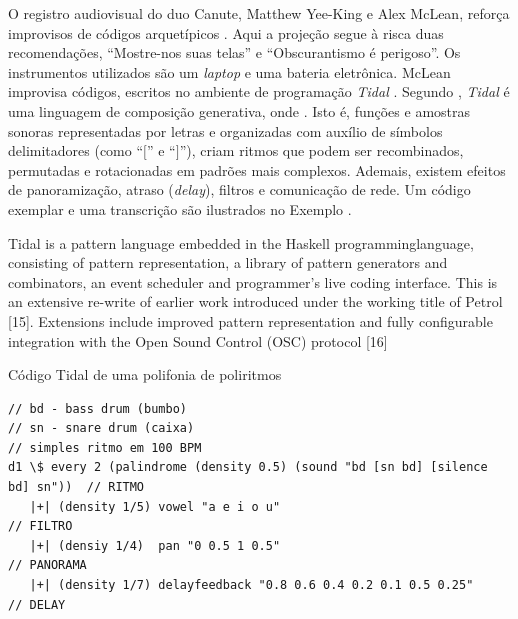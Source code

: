 O registro audiovisual do duo Canute, Matthew Yee-King e Alex McLean, reforça improvisos de códigos arquetípicos . Aqui a projeção segue à risca duas recomendações, ``Mostre-nos suas telas''\label{sec:showusyourscreens} e ``Obscurantismo é perigoso''. Os instrumentos utilizados são um \emph{laptop} e uma bateria eletrônica.  McLean improvisa códigos, escritos no ambiente de programação \emph{Tidal} . Segundo , \emph{Tidal} é uma linguagem de composição generativa, onde . Isto é, funções e amostras sonoras representadas por letras e organizadas com auxílio de símbolos delimitadores (como ``$[$'' e ``$]$''), criam ritmos que podem ser recombinados, permutadas e rotacionadas em padrões mais complexos.  Ademais, existem efeitos de panoramização, atraso (\emph{delay}), filtros e comunicação de rede. Um código exemplar e uma transcrição são ilustrados no Exemplo .

\begin{citacao}
{Tidal is a pattern language embedded in the Haskell programminglanguage, consisting of pattern representation, a library of pattern generators and combinators, an event scheduler and programmer’s live coding interface. This is an extensive re-write of earlier work introduced under the working title of Petrol [15]. Extensions include improved pattern representation and fully configurable integration with the Open Sound Control (OSC) protocol [16]
}
\end{citacao}

\begin{example}{Código Tidal de uma polifonia de poliritmos}
\begin{verbatim}
// bd - bass drum (bumbo)
// sn - snare drum (caixa)
// simples ritmo em 100 BPM
d1 \$ every 2 (palindrome (density 0.5) (sound "bd [sn bd] [silence bd] sn"))  // RITMO
   |+| (density 1/5) vowel "a e i o u"                                         // FILTRO
   |+| (densiy 1/4)  pan "0 0.5 1 0.5"                                         // PANORAMA
   |+| (density 1/7) delayfeedback "0.8 0.6 0.4 0.2 0.1 0.5 0.25"              // DELAY
\end{verbatim}
\label{ex:tidal}
\end{example}

